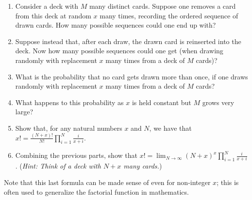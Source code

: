 \documentclass[11pt]{article}
\newif\ifsolutions
\begin{document}
\begin{enumerate}
\begin{enumerate}
\item Consider a deck with $M$ many distinct cards. Suppose one removes a card from this deck at random $x$ many times, recording the ordered sequence of drawn cards. How many possible sequences could one end up with?
\item Suppose instead that, after each draw, the drawn card is reinserted into the deck. Now how many possible sequences could one get (when drawing randomly with replacement $x$ many times from a deck of $M$ cards)?
\item What is the probability that no card gets drawn more than once, if one draws randomly with replacement $x$ many times from a deck of $M$ cards?
\item What happens to this probability as $x$ is held constant but $M$ grows very large?
\item Show that, for any natural numbers $x$ and $N$, we have that $\displaystyle x! = \frac{(N + x)!}{N!} \prod_{i = 1}^{N} \frac{i}{x + i}$.
\item Combining the previous parts, show that $\displaystyle x! = \lim_{N \rightarrow \infty} (N + x)^x \prod_{i = 1}^{N} \frac{i}{x + i}$. (\textit{Hint: Think of a deck with $N + x$ many cards.})
\end{enumerate}
Note that this last formula can be made sense of even for non-integer $x$; this is often used to generalize the factorial function in mathematics.


\ifsolutions
{\color{blue}{
  {\bf Solutions:}
\begin{enumerate}
\item $M!/(M - x)!$.
\item $M^x$.
\item $\frac{M!/(M - x)!}{M^x} = \displaystyle \prod_{i = 0}^{x - 1} \frac{M - i}{M} = \prod_{i = 0}^{x - 1} (1 - i/M)$.
\item As seen in at the end of the last answer sketch, this is the product of a constant number of factors, each of which approaches $1$ as $M$ grows very large. Thus, this probability itself approaches $1$ as $M$ grows very large.
\item Simply note that the product on the right is $\frac{N!}{(N + x)!/x!}$, and then cancel out the $N!$ and $(N + x)!$.
\item Take the result from the previous section, and subsitute $(N + x)^x$ for $\frac{(N + x)!}{N!}$, using the fact that their limiting ratio is $1$ for large $N$ (as established two sections ago).
\end{enumerate}
}}
\fi

   
\end{enumerate}
\end{document}

